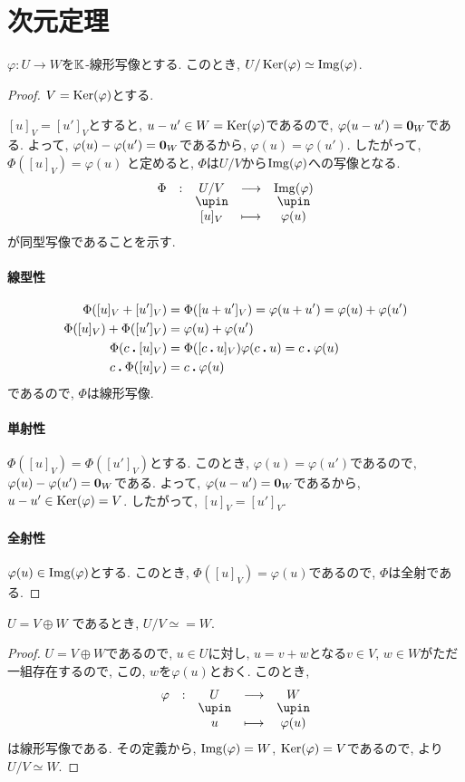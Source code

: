 \section{次元定理}
\begin{theorem}
  \label{thm:fund:hom}
  $\varphi\colon U \to W$を$\mathbb{K}$-線形写像とする.
  このとき,
  $U/\operatorname{Ker}(\varphi)\simeq \operatorname{Img}(\varphi)$.
\end{theorem}
\begin{proof}
  $V=\operatorname{Ker}(\varphi)$とする.
  
  $[u]_V=[u']_V$とすると, $u-u'\in W=\operatorname{Ker}(\varphi)$であるので,
  $\varphi(u-u')=\boldsymbol{0}_W$である.
  よって, $\varphi(u)-\varphi(u')=\boldsymbol{0}_W$であるから,
  $\varphi(u)=\varphi(u')$.
  したがって, $\Phi([u]_V)=\varphi(u)$
  と定めると,
  $\Phi$は$U/V$から$\operatorname{Img}(\varphi)$への写像となる.
  \begin{align*}
    \shazo{\Phi}{U/V}{\Img(\varphi)}
    {[u]_V}{\varphi(u)}
  \end{align*}
  が同型写像であることを示す.
  \paragraph{線型性}
  \begin{align*}
    \Phi([u]_V+[u']_V)&=\Phi([u+u']_V)=\varphi(u+u')=\varphi(u)+\varphi(u')\\
    \Phi([u]_V)+\Phi([u']_V)&=\varphi(u)+\varphi(u')\\
    \Phi(c\mathbin{\boldsymbol{.}} [u]_V)&=\Phi([c\mathbin{\boldsymbol{.}} u]_V)\varphi(c\mathbin{\boldsymbol{.}} u)=c\mathbin{\boldsymbol{.}} \varphi(u)\\
    c\mathbin{\boldsymbol{.}} \Phi([u]_V)&=c\mathbin{\boldsymbol{.}} \varphi(u)
  \end{align*}
  であるので, $\Phi$は線形写像.
  \paragraph{単射性}
  $\Phi([u]_V)=\Phi([u']_V)$とする.
  このとき, $\varphi(u)=\varphi(u')$であるので,
  $\varphi(u)-\varphi(u')=\boldsymbol{0}_W$である.
  よって,
  $\varphi(u-u')=\boldsymbol{0}_W$であるから,
  $u-u'\in \operatorname{Ker}(\varphi)=V$.
  したがって, $[u]_V=[u']_V$.
  
  \paragraph{全射性}
  $\varphi(u)\in \operatorname{Img}(\varphi)$とする.
  このとき, $\Phi([u]_V)=\varphi(u)$であるので,
  $\Phi$は全射である.
\end{proof}

\begin{cor}
$U=V\oplus W$
  であるとき, $U/V\simeq= W$.
\end{cor}
\begin{proof}
$U=V\oplus W$であるので,
  $u\in U$に対し,
  $u=v+w$となる$v\in V$, $w\in W$がただ一組存在するので,
  この, $w$を$\varphi(u)$とおく.
  このとき,
  \begin{align*}
    \shazo{\varphi}{U}{W}{u}{\varphi(u)}
  \end{align*}
  は線形写像である.
  その定義から, $\operatorname{Img}(\varphi)=W$, $\operatorname{Ker}(\varphi)=V$であるので,
  より $U/V\simeq W$.
\end{proof}

